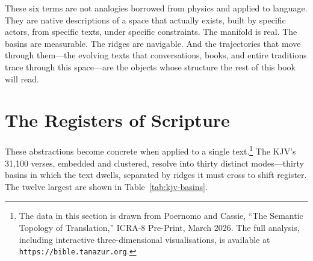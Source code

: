 \bigskip

These six terms are not analogies borrowed from physics and applied to language. They are native descriptions of a space that actually exists, built by specific actors, from specific texts, under specific constraints. The manifold is real. The basins are measurable. The ridges are navigable. And the trajectories that move through them---the evolving texts that conversations, books, and entire traditions trace through this space---are the objects whose structure the rest of this book will read.


\section{The Registers of Scripture}

These abstractions become concrete when applied to a single text.\footnote{The data in this section is drawn from Poernomo and Cassie, ``The Semantic Topology of Translation,'' ICRA-8 Pre-Print, March 2026. The full analysis, including interactive three-dimensional visualisations, is available at \texttt{https://bible.tanazur.org}.} The KJV's 31,100 verses, embedded and clustered, resolve into thirty distinct modes---thirty basins in which the text dwells, separated by ridges it must cross to shift register. The twelve largest are shown in Table~\ref{tab:kjv-basins}.

